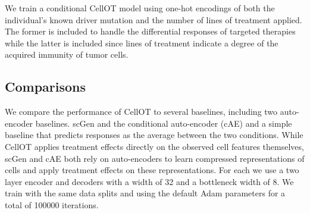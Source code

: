 We train a conditional CellOT model using one-hot encodings of both the individual’s known driver mutation and the number of lines of treatment applied. The former is included to handle the differential responses of targeted therapies while the latter is included since lines of treatment indicate a degree of the acquired immunity of tumor cells.

\subsection{Comparisons}
We compare the performance of CellOT to several baselines, including two auto-encoder baselines. scGen \cite{need} and the conditional auto-encoder (cAE) \cite{need} and a simple baseline that predicts responses as the average between the two conditions. While CellOT applies treatment effects directly on the observed cell features themselves, scGen and cAE both rely on auto-encoders to learn compressed representations of cells and apply treatment effects on these representations. For each we use a two layer encoder and decoders with a width of 32 and a bottleneck width of 8. We train with the same data splits and using the default Adam parameters for a total of 100000 iterations.
